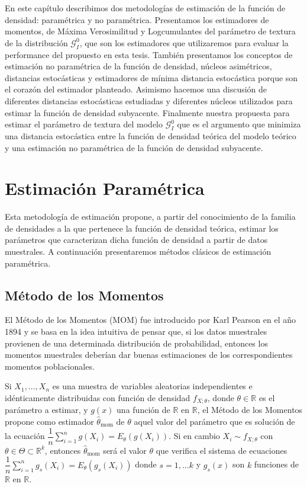 En este capítulo describimos dos metodologías de estimación de la función de densidad: paramétrica y no paramétrica. Presentamos los estimadores de momentos, de Máxima Verosimilitud y Logcumulantes del parámetro de textura de la distribución $\mathcal{G}_I^0$, que son los estimadores que utilizaremos para evaluar la performance del propuesto en esta tesis. También presentamos los conceptos de estimación no paramétrica de la función de densidad, núcleos asimétricos, distancias estocásticas y estimadores de mínima distancia estocástica porque son el corazón del estimador planteado.  Asimismo hacemos una discusión de diferentes distancias estocásticas estudiadas y diferentes núcleos utilizados para estimar la función de densidad subyacente. Finalmente nuestra propuesta para estimar el parámetro de textura del modelo $\mathcal{G}_I^0$ que es el argumento que minimiza una distancia estocástica entre la función de densidad teórica del modelo teórico y una estimación no paramétrica de la función de densidad subyacente. 


\section{Estimación Paramétrica}
\label{EstimacionParamétrica}

Esta metodología de estimación propone, a partir del conocimiento de la familia de densidades a la que pertenece la función de densidad teórica, estimar los parámetros que caracterizan dicha función de densidad a partir de datos muestrales. A continuación presentaremos métodos clásicos de estimación paramétrica.

\subsection{Método de los Momentos}
\label{MetodoMOM}
El Método de los Momentos (MOM) fue introducido por Karl Pearson en el año 1894 y se basa en la idea intuitiva de pensar que, si los datos muestrales provienen de una determinada distribución de probabilidad, entonces los momentos muestrales deberían dar buenas estimaciones de los correspondientes momentos poblacionales. 

\begin{definition}
Si $X_1, \ldots, X_n$ es una muestra de variables aleatorias independientes e idénticamente distribuidas con función de densidad $f_{X;\theta}$, donde $\theta \in \mathbb{R}$ es el parámetro a estimar, y $g(x)$ una función de $\mathbb{R}$ en $\mathbb{R}$, el Método de los Momentos propone como estimador $\hat{\theta}_{\text{mom}}$ de $\theta$ aquel valor del parámetro que es solución de la ecuación  $\dfrac{1}{n} \sum_{i=1}^n g(X_i)=E_{\theta}(g(X_i)).$  
Si en cambio $X_i \sim f_{X;\theta}$ con $\theta \in \Theta \subset \mathbb{R}^k$, entonces $\hat{\theta}_{\text{mom}}$ será el valor $\theta$ que verifica el sistema de ecuaciones $\dfrac{1}{n} \sum_{i=1}^n g_s(X_i)=E_{\theta}(g_s(X_i))$ donde $s=1, \ldots k$ y $g_s(x)$ son $k$ funciones de $\mathbb{R}$ en $\mathbb{R}$.
\end{definition}


